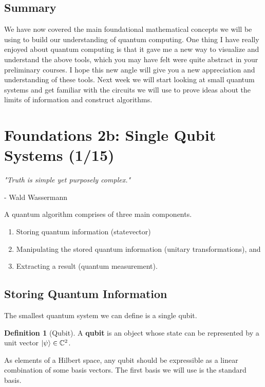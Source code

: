 \documentclass[letterpaper, 12pt]{article}
\newcommand{\C}{\mathbb{C}}	%
\newcommand{\1}{\mathds{1}}	%
\theoremstyle{definition}
\newtheorem{definition}[theorem]{Definition}
\begin{document}
\subsection{Summary}

We have now covered the main foundational mathematical concepts we will be using to build our understanding of quantum computing. One thing I have really enjoyed about quantum computing is that it gave me a new way to visualize and understand the above tools, which you may have felt were quite abstract in your preliminary courses. I hope this new angle will give you a new appreciation and understanding of these tools. Next week we will start looking at small quantum systems and get familiar with the circuits we will use to prove ideas about the limits of information and construct algorithms. 

\newpage 

\section[Foundations 2b -- {\it Single Qubit Systems}]{Foundations 2b: Single Qubit Systems (1/15)}

\textit{"Truth is simple yet purposely complex."
}

{\small{- Wald Wassermann}}

A quantum algorithm comprises of three main components. 
\begin{enumerate}
    \item Storing quantum information (statevector)
    \item Manipulating the stored quantum information (unitary transformations), and 
    \item Extracting a result (quantum measurement).
\end{enumerate}

\subsection{Storing Quantum Information}

The smallest quantum system we can define is a single qubit. 

\begin{definition}[Qubit]
    A \textbf{qubit} is an object whose state can be represented by a unit vector $\ket{\psi} \in \C^2$. 
\end{definition}

As elements of a Hilbert space, any qubit should be expressible as a linear combination of some basis vectors. The first basis we will use is the standard basis.
\end{document}

